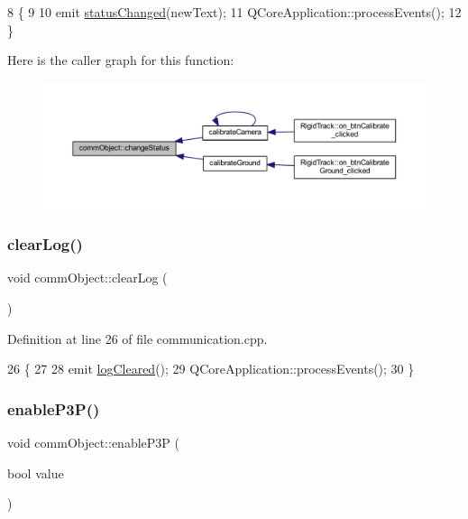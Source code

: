 \begin{DoxyCode}
8                                              \{
9 
10     emit \hyperlink{classcomm_object_adccf5b5946d35d5cf6d76f367f93e335}{statusChanged}(newText);
11     QCoreApplication::processEvents();
12 \}
\end{DoxyCode}
Here is the caller graph for this function\+:
\nopagebreak
\begin{figure}[H]
\begin{center}
\leavevmode
\includegraphics[width=350pt]{classcomm_object_a1f4b8dd22ecc46bab619f6b1fe1a5144_icgraph}
\end{center}
\end{figure}
\mbox{\label{classcomm_object_a785f776d16f1871786bb88482fc4dd1f}} 
\subsubsection{\texorpdfstring{clear\+Log()}{clearLog()}}
{\footnotesize\ttfamily void comm\+Object\+::clear\+Log (\begin{DoxyParamCaption}{ }\end{DoxyParamCaption})}



Definition at line 26 of file communication.\+cpp.


\begin{DoxyCode}
26                           \{
27 
28     emit \hyperlink{classcomm_object_af2304085624c26230e9d930d616e3e19}{logCleared}();
29     QCoreApplication::processEvents();
30 \}
\end{DoxyCode}
\mbox{\label{classcomm_object_a7552116eb5e18c49c6dcf943de29af7a}} 
\subsubsection{\texorpdfstring{enable\+P3\+P()}{enableP3P()}}
{\footnotesize\ttfamily void comm\+Object\+::enable\+P3P (\begin{DoxyParamCaption}\item[{bool}]{value }\end{DoxyParamCaption})}



